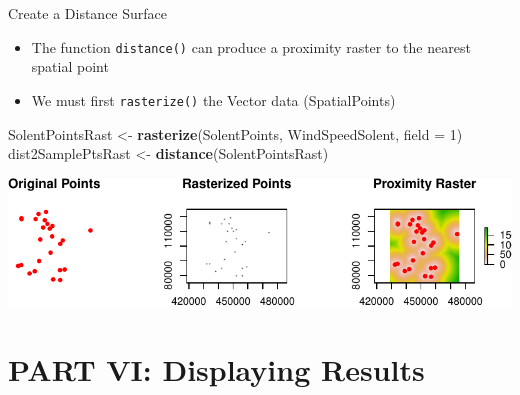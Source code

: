 \documentclass[10pt,ignorenonframetext,]{beamer}
\newenvironment{Shaded}{\begin{snugshade}}{\end{snugshade}}
\newcommand{\KeywordTok}[1]{\textcolor[rgb]{0.13,0.29,0.53}{\textbf{{#1}}}}
\newcommand{\DataTypeTok}[1]{\textcolor[rgb]{0.13,0.29,0.53}{{#1}}}
\newcommand{\DecValTok}[1]{\textcolor[rgb]{0.00,0.00,0.81}{{#1}}}
\newcommand{\StringTok}[1]{\textcolor[rgb]{0.31,0.60,0.02}{{#1}}}
\newcommand{\NormalTok}[1]{{#1}}
\providecommand{\tightlist}{%
  \setlength{\itemsep}{0pt}\setlength{\parskip}{0pt}}
\begin{document}
\begin{frame}[fragile]{Create a Distance Surface}

\begin{itemize}
\tightlist
\item
  The function \texttt{distance()} can produce a proximity raster to the
  nearest spatial point
\item
  We must first \texttt{rasterize()} the Vector data (SpatialPoints)
\end{itemize}

\begin{Shaded}
\begin{Highlighting}[]
\NormalTok{SolentPointsRast <-}\StringTok{ }\KeywordTok{rasterize}\NormalTok{(SolentPoints, WindSpeedSolent, }
    \DataTypeTok{field =} \DecValTok{1}\NormalTok{)}
\NormalTok{dist2SamplePtsRast <-}\StringTok{ }\KeywordTok{distance}\NormalTok{(SolentPointsRast)}
\end{Highlighting}
\end{Shaded}

\begin{center}\includegraphics[width=1\linewidth]{SpatialDataLecture_files/figure-beamer/unnamed-chunk-38-1} \end{center}

\end{frame}

\section{PART VI: Displaying Results}\label{part-vi-displaying-results}
\end{document}
